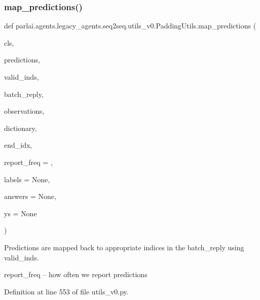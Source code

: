 \subsubsection{\texorpdfstring{map\+\_\+predictions()}{map\_predictions()}}
{\footnotesize\ttfamily def parlai.\+agents.\+legacy\+\_\+agents.\+seq2seq.\+utils\+\_\+v0.\+Padding\+Utils.\+map\+\_\+predictions (\begin{DoxyParamCaption}\item[{}]{cls,  }\item[{}]{predictions,  }\item[{}]{valid\+\_\+inds,  }\item[{}]{batch\+\_\+reply,  }\item[{}]{observations,  }\item[{}]{dictionary,  }\item[{}]{end\+\_\+idx,  }\item[{}]{report\+\_\+freq = {},  }\item[{}]{labels = {\ttfamily None},  }\item[{}]{answers = {\ttfamily None},  }\item[{}]{ys = {\ttfamily None} }\end{DoxyParamCaption})}

\begin{DoxyVerb}Predictions are mapped back to appropriate indices in the batch_reply using
valid_inds.

report_freq -- how often we report predictions
\end{DoxyVerb}
 

Definition at line 553 of file utils\+\_\+v0.\+py.


